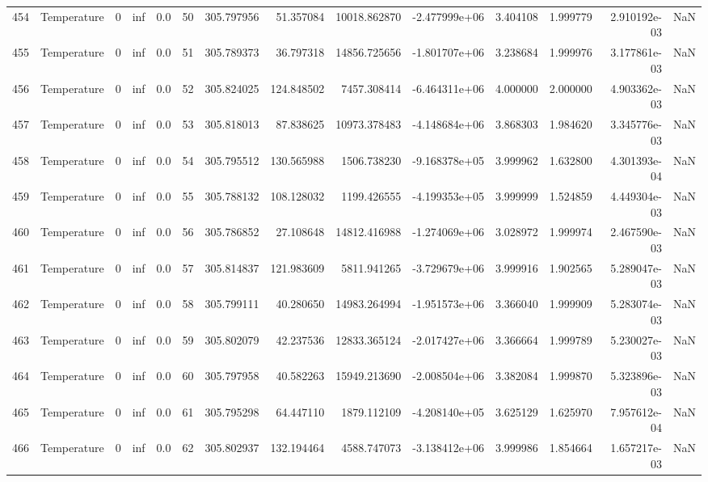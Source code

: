 \begin{tabular}{llrrrrrrrrrrrr}
454 &  Temperature &       0 &  inf &  0.0 &   50 &  305.797956 &    51.357084 &   10018.862870 & -2.477999e+06 &  3.404108 &  1.999779 &  2.910192e-03 &      NaN \\
455 &  Temperature &       0 &  inf &  0.0 &   51 &  305.789373 &    36.797318 &   14856.725656 & -1.801707e+06 &  3.238684 &  1.999976 &  3.177861e-03 &      NaN \\
456 &  Temperature &       0 &  inf &  0.0 &   52 &  305.824025 &   124.848502 &    7457.308414 & -6.464311e+06 &  4.000000 &  2.000000 &  4.903362e-03 &      NaN \\
457 &  Temperature &       0 &  inf &  0.0 &   53 &  305.818013 &    87.838625 &   10973.378483 & -4.148684e+06 &  3.868303 &  1.984620 &  3.345776e-03 &      NaN \\
458 &  Temperature &       0 &  inf &  0.0 &   54 &  305.795512 &   130.565988 &    1506.738230 & -9.168378e+05 &  3.999962 &  1.632800 &  4.301393e-04 &      NaN \\
459 &  Temperature &       0 &  inf &  0.0 &   55 &  305.788132 &   108.128032 &    1199.426555 & -4.199353e+05 &  3.999999 &  1.524859 &  4.449304e-03 &      NaN \\
460 &  Temperature &       0 &  inf &  0.0 &   56 &  305.786852 &    27.108648 &   14812.416988 & -1.274069e+06 &  3.028972 &  1.999974 &  2.467590e-03 &      NaN \\
461 &  Temperature &       0 &  inf &  0.0 &   57 &  305.814837 &   121.983609 &    5811.941265 & -3.729679e+06 &  3.999916 &  1.902565 &  5.289047e-03 &      NaN \\
462 &  Temperature &       0 &  inf &  0.0 &   58 &  305.799111 &    40.280650 &   14983.264994 & -1.951573e+06 &  3.366040 &  1.999909 &  5.283074e-03 &      NaN \\
463 &  Temperature &       0 &  inf &  0.0 &   59 &  305.802079 &    42.237536 &   12833.365124 & -2.017427e+06 &  3.366664 &  1.999789 &  5.230027e-03 &      NaN \\
464 &  Temperature &       0 &  inf &  0.0 &   60 &  305.797958 &    40.582263 &   15949.213690 & -2.008504e+06 &  3.382084 &  1.999870 &  5.323896e-03 &      NaN \\
465 &  Temperature &       0 &  inf &  0.0 &   61 &  305.795298 &    64.447110 &    1879.112109 & -4.208140e+05 &  3.625129 &  1.625970 &  7.957612e-04 &      NaN \\
466 &  Temperature &       0 &  inf &  0.0 &   62 &  305.802937 &   132.194464 &    4588.747073 & -3.138412e+06 &  3.999986 &  1.854664 &  1.657217e-03 &      NaN \\

\end{tabular}
